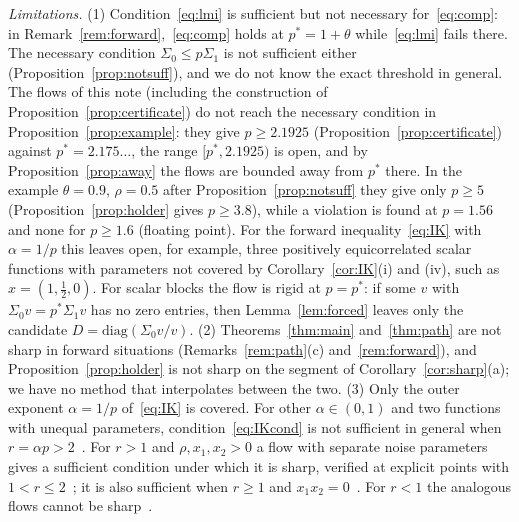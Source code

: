 \documentclass[11pt]{amsart}
\theoremstyle{definition}
\begin{document}
\emph{Limitations.} (1) Condition~\eqref{eq:lmi} is sufficient but not necessary for~\eqref{eq:comp}: in
Remark~\ref{rem:forward},~\eqref{eq:comp} holds at $p^*=1+\theta$ while~\eqref{eq:lmi} fails there. The necessary
condition $\Sigma_0\le p\Sigma_1$ is not sufficient either (Proposition~\ref{prop:notsuff}), and we do not know the
exact threshold in general. The flows of this note (including the
construction of Proposition~\ref{prop:certificate}) do not reach the necessary condition in
Proposition~\ref{prop:example}: they give $p\ge2.1925$
(Proposition~\ref{prop:certificate}) against $p^*=2.175\ldots$, the range $[p^*,2.1925)$ is open, and by
Proposition~\ref{prop:away} the flows are bounded away from $p^*$ there. In the example $\theta=0.9$, $\rho=0.5$ after
Proposition~\ref{prop:notsuff} they give only $p\ge5$ (Proposition~\ref{prop:holder} gives $p\ge3.8$), while a
violation is found at $p=1.56$ and none for $p\ge1.6$ (floating point). For the forward
inequality~\eqref{eq:IK} with $\alpha=1/p$ this leaves open, for example, three positively equicorrelated scalar
functions with parameters not covered by Corollary~\ref{cor:IK}(i) and (iv), such as $x=(1,\frac12,0)$. For scalar
blocks the flow is rigid at $p=p^*$: if some $v$ with $\Sigma_0v=p^*\Sigma_1v$ has no zero entries, then
Lemma~\ref{lem:forced} leaves only the candidate $D=\mathrm{diag}(\Sigma_0v/v)$. (2) Theorems~\ref{thm:main} and~\ref{thm:path} are
not sharp in forward situations (Remarks~\ref{rem:path}(c) and~\ref{rem:forward}), and Proposition~\ref{prop:holder}
is not sharp on the segment of Corollary~\ref{cor:sharp}(a); we have no method that interpolates between the two. (3) Only the outer exponent
$\alpha=1/p$ of~\eqref{eq:IK} is covered. For other $\alpha\in(0,1)$ and two functions with unequal parameters,
condition~\eqref{eq:IKcond} is not sufficient in general when $r=\alpha p>2$~\cite[Props.~6.3, 6.5]{FR}. For $r>1$
and $\rho,x_1,x_2>0$ a flow with separate noise parameters gives a sufficient condition under which it is sharp,
verified at explicit points with $1<r\le2$~\cite[Thm.~6.9, Prop.~6.11]{FR}; it is also sufficient when $r\ge1$ and
$x_1x_2=0$~\cite[Prop.~6.4]{FR}. For $r<1$ the analogous flows cannot be sharp~\cite[Remark~6.7(b)]{FR}.
\end{document}
